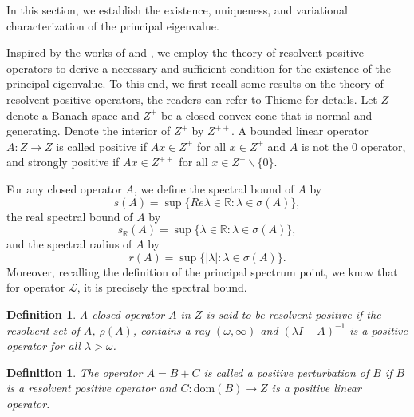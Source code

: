 \documentclass[11pt,reqno]{amsart}
\newtheorem{definition}[theorem]{Definition}
\numberwithin{equation}{section}
\begin{document}
In this section, we establish the existence, uniqueness, and variational characterization of the principal eigenvalue.

Inspired by the works of \cite{KR} and \cite{Feng}, we employ the theory of resolvent positive operators to derive a necessary and sufficient condition for the existence of the principal eigenvalue. To this end, we first recall some results on the theory of resolvent positive operators, the readers can refer to Thieme \cite{Th1, Th2} for details.
Let $Z$ denote a Banach space and $Z^{+}$ be a closed convex cone that is normal and generating.
Denote the interior of $Z^{+}$ by $Z^{++}$.
A bounded linear operator $A : Z \to Z$ is called positive if $Ax \in Z^{+}$ for all $x \in Z^{+}$ and $A$ is not the $0$ operator, and strongly positive if $Ax \in Z^{++} $ for all $x\in Z^{+} \backslash \{ 0 \}$.

For any closed operator $A$, we define the spectral bound of $A$ by
\begin{equation*}
s(A) = \sup \{ Re \lambda \in \mathbb{R} : \lambda \in \sigma(A) \},
\end{equation*}
the real spectral bound of $A$ by
\begin{equation*}
s_{\mathbb{R}}(A) = \sup \{ \lambda \in \mathbb{R} : \lambda \in \sigma(A) \},
\end{equation*}
and the spectral radius of $A$ by
\begin{equation*}
r(A) = \sup \{  |\lambda|  : \lambda \in \sigma(A) \}.
\end{equation*}
Moreover, recalling the definition of the principal spectrum point, we know that for operator $\mathcal{L}$, it is precisely the spectral bound.


\begin{definition}{\rm
A closed operator $A$ in $Z$ is said to be resolvent positive if the resolvent set of $A$, $\rho(A)$, contains a ray $(\omega , \infty)$ and $(\lambda I - A)^{-1}$ is a positive operator for all $\lambda > \omega$.
}
\end{definition}

\begin{definition}{\rm
The operator $A = B + C$ is called a positive perturbation of $B$ if $B$ is a resolvent positive operator and $C : \text{dom}(B) \to Z$ is a positive linear operator.
}
\end{definition}
\end{document}
